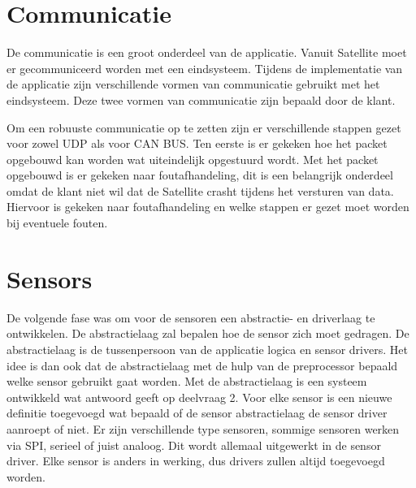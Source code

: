 \section{Communicatie}
De communicatie is een groot onderdeel van de applicatie. Vanuit Satellite moet er gecommuniceerd worden met een eindsysteem. Tijdens de implementatie van de applicatie zijn verschillende vormen van communicatie gebruikt met het eindsysteem. Deze twee vormen van communicatie zijn bepaald door de klant. \newline

\noindent Om een robuuste communicatie op te zetten zijn er verschillende stappen gezet voor zowel UDP als voor CAN BUS. Ten eerste is er gekeken hoe het packet opgebouwd kan worden wat uiteindelijk opgestuurd wordt. Met het packet opgebouwd is er gekeken naar foutafhandeling, dit is een belangrijk onderdeel omdat de klant niet wil dat de Satellite crasht tijdens het versturen van data. Hiervoor is gekeken naar foutafhandeling en welke stappen er gezet moet worden bij eventuele fouten.


\section{Sensors}
De volgende fase was om voor de sensoren een abstractie- en driverlaag te ontwikkelen. De abstractielaag zal bepalen hoe de sensor zich moet gedragen. De abstractielaag is de tussenpersoon van de applicatie logica en sensor drivers. Het idee is dan ook dat de abstractielaag met de hulp van de preprocessor bepaald welke sensor gebruikt gaat worden. Met de abstractielaag is een systeem ontwikkeld wat antwoord geeft op deelvraag 2. Voor elke sensor is een nieuwe definitie toegevoegd wat bepaald of de sensor abstractielaag de sensor driver aanroept of niet. Er zijn verschillende type sensoren, sommige sensoren werken via SPI, serieel of juist analoog. Dit wordt allemaal uitgewerkt in de sensor driver. Elke sensor is anders in werking, dus drivers zullen altijd toegevoegd worden.